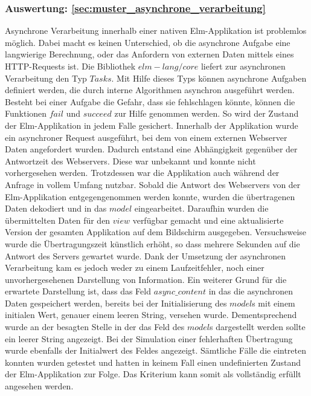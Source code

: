 \subsubsection{Auswertung: \ref{sec:muster_asynchrone_verarbeitung} }
Asynchrone Verarbeitung innerhalb einer nativen Elm-Applikation ist problemlos möglich. Dabei macht es keinen Unterschied, ob die asynchrone Aufgabe eine langwierige Berechnung, oder das Anfordern von externen Daten mittels eines \ac{HTTP}-Requests ist. Die Bibliothek $elm-lang/core$ liefert zur asynchronen Verarbeitung den Typ $Tasks$. Mit Hilfe dieses Typs  können asynchrone Aufgaben definiert werden, die durch interne Algorithmen asynchron ausgeführt werden. Besteht bei einer Aufgabe die Gefahr, dass sie fehlschlagen könnte, können die Funktionen $fail$ und $succeed$ zur Hilfe genommen werden. So wird der Zustand der Elm-Applikation in jedem Falle gesichert. Innerhalb der Applikation wurde ein asynchroner Request ausgeführt, bei dem von einem externen Webserver Daten angefordert wurden. Dadurch entstand eine Abhängigkeit gegenüber der Antwortzeit des Webservers. Diese war unbekannt und konnte nicht vorhergesehen werden. Trotzdessen war die Applikation auch während der Anfrage in vollem Umfang nutzbar. Sobald die Antwort des Webservers von der Elm-Applikation entgegengenommen werden konnte, wurden die übertragenen Daten dekodiert und in das $model$ eingearbeitet. Daraufhin wurden die übermittelten Daten für den $view$ verfügbar gemacht und eine aktualisierte Version der gesamten Applikation auf dem Bildschirm ausgegeben.
Versuchsweise wurde die Übertragungszeit künstlich erhöht, so dass mehrere Sekunden auf die Antwort des Servers gewartet wurde. Dank der Umsetzung der asynchronen Verarbeitung kam es jedoch weder zu einem Laufzeitfehler, noch einer unvorhergesehenen Darstellung von Information. Ein weiterer Grund für die erwartete Darstellung ist, dass das Feld $async\_content$ in das die asynchronen Daten gespeichert werden, bereits bei der Initialisierung des $model$s mit einem initialen Wert, genauer einem leeren String, versehen wurde. Dementsprechend wurde an der besagten Stelle in der das Feld des $model$s dargestellt werden sollte ein leerer String angezeigt. Bei der Simulation einer fehlerhaften Übertragung wurde ebenfalls der Initialwert des Feldes angezeigt. Sämtliche Fälle die eintreten konnten wurden getestet und hatten in keinem Fall einen undefinierten Zustand der Elm-Applikation zur Folge.
Das Kriterium kann somit als vollständig erfüllt angesehen werden.

